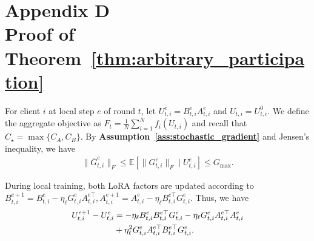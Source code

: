 \documentclass[lettersize,journal]{IEEEtran}
\begin{document}
	
	\section*{Appendix D \\ Proof of Theorem~\ref{thm:arbitrary_participation}}
	\label{app:convergence_proof}
	
	
	For client $i$ at local step $e$ of round $t$, let
	$U_{t,i}^{e}=B_{t,i}^{e}A_{t,i}^{e}$ and
	$U_{t,i}=U_{t,i}^{0}$. We define the aggregate objective as
	$F_t=\frac{1}{N}\sum_{i=1}^{N}f_i(U_{t,i})$ and recall that
	$C_\star=\max\{C_A,C_B\}$. By
	\textbf{Assumption~\ref{ass:stochastic_gradient}} and Jensen's inequality, we have
	\begin{align}
		\|\bar{G}_{t,i}^{e}\|_F
		\le
		\mathbb{E}
		\left[
		\|G_{t,i}^{e}\|_F
		\mid U_{t,i}^{e}
		\right]
		\le
		G_{\max}.
	\end{align}
	
	During local training, both LoRA factors are updated according to $    B_{t,i}^{e+1}
	=
	B_{t,i}^{e}
	-
	\eta_{\ell}
	G_{t,i}^{e}
	A_{t,i}^{e\top}, 
	A_{t,i}^{e+1}
	=
	A_{t,i}^{e}
	-
	\eta_{\ell}
	B_{t,i}^{e\top}
	G_{t,i}^{e}$.
	Thus, we have
	\begin{align}
		U_{t,i}^{e+1}-U_{t,i}^{e}
		&=
		-\eta_{\ell}
		B_{t,i}^{e}B_{t,i}^{e\top}G_{t,i}^{e}
		-
		\eta_{\ell}
		G_{t,i}^{e}A_{t,i}^{e\top}A_{t,i}^{e}
		\notag\\
		&+
		\eta_{\ell}^{2}
		G_{t,i}^{e}A_{t,i}^{e\top}
		B_{t,i}^{e\top}G_{t,i}^{e}.
		\label{eq:product_change}
	\end{align}
	
\end{document}
